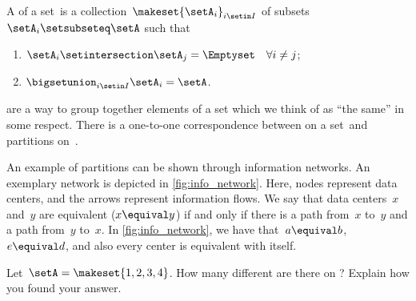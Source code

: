 \begin{ctdefinition}[Partition]
    \label{def:partition}
    A  of a set~\setA is a collection~$\makeset{\setA_i}_{i\setin I}$ of subsets~$\setA_i\setsubseteq \setA$ such that
    \begin{enumerate}
        \item $\setA_i\setintersection \setA_j=\Emptyset \quad \forall i\neq j$;
        \item $\bigsetunion_{i\setin I}\setA_i=\setA$.
    \end{enumerate}
\end{ctdefinition}

\begin{remark}
     are a way to group together elements of a set which we think of as ``the same'' in some respect.
    There is a one-to-one correspondence between  on a set~\setA and partitions on~\setA.
\end{remark}

\begin{marginfigure}
    \centering
    \caption{
        \label{fig:info_network}
    }
\end{marginfigure}

\begin{example}
    An example of partitions can be shown through information networks.
    An exemplary network is depicted in \cref{fig:info_network}.
    Here, nodes represent data centers, and the arrows represent information flows.
    We say that data centers~$x$ and~$y$ are equivalent ($x\equival y$) if and only if there is a path from~$x$ to~$y$ and a path from~$y$ to~$x$.
    In \cref{fig:info_network}, we have that~$a\equival b$,~$e\equival d$, and also every center is equivalent with itself.
\end{example}

\vfill
\begin{gradedexercise}
    \label{ex:CountingEquivalenceRelations}
    Let~$\setA = \makeset{ 1, 2, 3, 4 }$.
    How many different  are there on \setA?
    Explain how you found your answer.
\end{gradedexercise}

